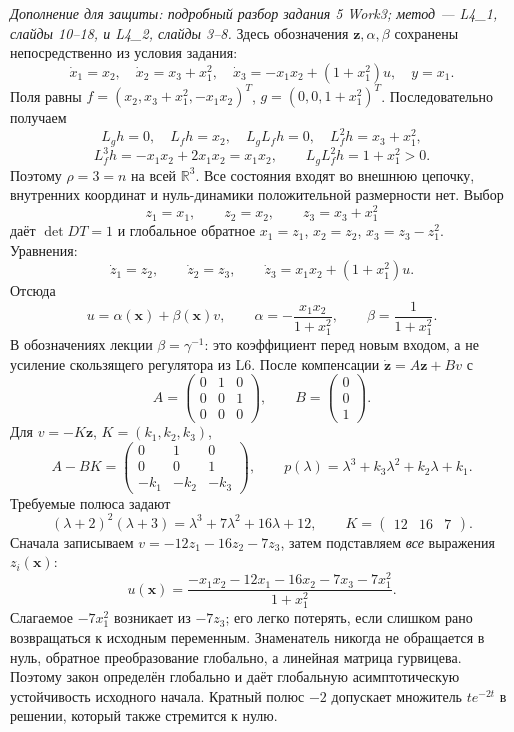 \textit{Дополнение для защиты: подробный разбор задания 5 Work3;
метод --- L4\_1, слайды 10--18, и L4\_2, слайды 3--8.}
Здесь обозначения $\bm z,\alpha,\beta$ сохранены непосредственно
из условия задания:
\[
 \dot x_1=x_2,\quad\dot x_2=x_3+x_1^2,\quad
 \dot x_3=-x_1x_2+(1+x_1^2)u,\quad y=x_1.
\]
Поля равны $f=(x_2,x_3+x_1^2,-x_1x_2)^T$,
$g=(0,0,1+x_1^2)^T$. Последовательно получаем
\[
 L_gh=0,\quad L_fh=x_2,\quad L_gL_fh=0,\quad
 L_f^2h=x_3+x_1^2,
\]
\[
 L_f^3h=-x_1x_2+2x_1x_2=x_1x_2,\qquad
 L_gL_f^2h=1+x_1^2>0.
\]
Поэтому $\rho=3=n$ на всей $\mathbb R^3$. Все состояния входят
во внешнюю цепочку, внутренних координат и нуль-динамики положительной
размерности нет. Выбор
\[
 z_1=x_1,\qquad z_2=x_2,\qquad z_3=x_3+x_1^2
\]
даёт $\det DT=1$ и глобальное обратное
$x_1=z_1$, $x_2=z_2$, $x_3=z_3-z_1^2$. Уравнения:
\[
 \dot z_1=z_2,\qquad\dot z_2=z_3,\qquad
 \dot z_3=x_1x_2+(1+x_1^2)u.
\]
Отсюда
\[
 u=\alpha(\bm x)+\beta(\bm x)v,
 \qquad\alpha=-\frac{x_1x_2}{1+x_1^2},\qquad
 \beta=\frac{1}{1+x_1^2}.
\]
В обозначениях лекции $\beta=\gamma^{-1}$: это коэффициент перед
новым входом, а не усиление скользящего регулятора из L6.
После компенсации $\dot{\bm z}=A\bm z+Bv$ с
\[
 A=\begin{pmatrix}0&1&0\\0&0&1\\0&0&0\end{pmatrix},\qquad
 B=\begin{pmatrix}0\\0\\1\end{pmatrix}.
\]
Для $v=-K\bm z$, $K=(k_1,k_2,k_3)$,
\[
 A-BK=\begin{pmatrix}0&1&0\\0&0&1\\-k_1&-k_2&-k_3\end{pmatrix},
 \qquad p(\lambda)=\lambda^3+k_3\lambda^2+k_2\lambda+k_1.
\]
Требуемые полюса задают
\[
 (\lambda+2)^2(\lambda+3)=\lambda^3+7\lambda^2+16\lambda+12,
 \qquad K=\begin{pmatrix}12&16&7\end{pmatrix}.
\]
Сначала записываем $v=-12z_1-16z_2-7z_3$, затем подставляем
\emph{все} выражения $z_i(\bm x)$:
\[
 \boxed{u(\bm x)=
 \frac{-x_1x_2-12x_1-16x_2-7x_3-7x_1^2}{1+x_1^2}}.
\]
Слагаемое $-7x_1^2$ возникает из $-7z_3$; его легко потерять,
если слишком рано возвращаться к исходным переменным.
Знаменатель никогда не обращается в нуль, обратное преобразование
глобально, а линейная матрица гурвицева. Поэтому закон определён
глобально и даёт глобальную асимптотическую устойчивость исходного
начала. Кратный полюс $-2$ допускает множитель $t e^{-2t}$ в решении,
который также стремится к нулю.

